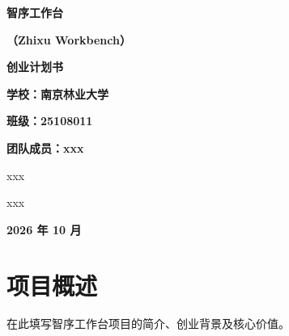 \documentclass[12pt,a4paper]{ctexart}
\begin{document}
\begin{titlepage}
    \centering

    \vspace*{3.5cm}

    {\bfseries 智序工作台\par}

    \vspace{0.5cm}

    {\bfseries （Zhixu Workbench）\par}

    \vspace{1.5cm}

    {\bfseries 创业计划书\par}

    \vfill

    \begin{flushleft}
        \hspace{2.5cm}
        \begin{minipage}{0.7\textwidth}
            \setlength{\baselineskip}{1.8em}

            \textbf{学校：南京林业大学}

            \textbf{班级：25108011}

            \textbf{团队成员：xxx}

            \hspace*{3.2em} xxx

            \hspace*{3.2em} xxx
        \end{minipage}
    \end{flushleft}

    \vspace{2cm}

    {\bfseries 2026 年 10 月\par}

    \vspace{1.5cm}

\end{titlepage}

\tableofcontents
\newpage

\section{项目概述}

在此填写智序工作台项目的简介、创业背景及核心价值。
\end{document}
